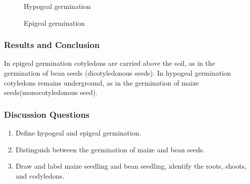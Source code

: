 \begin{figure}[h]
\begin{center}
\def\svgwidth{6cm}

\caption{Hypogeal germination}
\label{fig:hypogeal}
\end{center}
\end{figure}

\begin{figure}[h]
\begin{center}
\def\svgwidth{7cm}

\caption{Epigeal germination}
\label{fig:epigeal}
\end{center}
\end{figure}

\subsubsection*{Results and Conclusion}
In epigeal germination cotyledons are carried above the soil, as in the germination of bean seeds (dicotyledonous seeds). In hypogeal germination cotyledons remains underground, as in the germination of maize seeds(monocotyledonous seed).

\subsubsection*{Discussion Questions}
\begin{enumerate}
\item{Define hypogeal and epigeal germination.}
\item{Distinguish between the germination of maize and bean seeds.}
\item{Draw and label maize seedling and bean seedling, identify the roots, shoots, and codyledons.}
\end{enumerate}